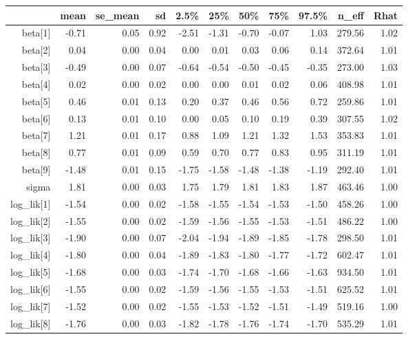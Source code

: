\begin{table}[ht]
\centering
\begin{tabular}{rrrrrrrrrrr}
  \hline
 & mean & se\_mean & sd & 2.5\% & 25\% & 50\% & 75\% & 97.5\% & n\_eff & Rhat \\ 
  \hline
beta[1] & -0.71 & 0.05 & 0.92 & -2.51 & -1.31 & -0.70 & -0.07 & 1.03 & 279.56 & 1.02 \\ 
  beta[2] & 0.04 & 0.00 & 0.04 & 0.00 & 0.01 & 0.03 & 0.06 & 0.14 & 372.64 & 1.01 \\ 
  beta[3] & -0.49 & 0.00 & 0.07 & -0.64 & -0.54 & -0.50 & -0.45 & -0.35 & 273.00 & 1.03 \\ 
  beta[4] & 0.02 & 0.00 & 0.02 & 0.00 & 0.00 & 0.01 & 0.02 & 0.06 & 408.98 & 1.01 \\ 
  beta[5] & 0.46 & 0.01 & 0.13 & 0.20 & 0.37 & 0.46 & 0.56 & 0.72 & 259.86 & 1.01 \\ 
  beta[6] & 0.13 & 0.01 & 0.10 & 0.00 & 0.05 & 0.10 & 0.19 & 0.39 & 307.55 & 1.02 \\ 
  beta[7] & 1.21 & 0.01 & 0.17 & 0.88 & 1.09 & 1.21 & 1.32 & 1.53 & 353.83 & 1.01 \\ 
  beta[8] & 0.77 & 0.01 & 0.09 & 0.59 & 0.70 & 0.77 & 0.83 & 0.95 & 311.19 & 1.01 \\ 
  beta[9] & -1.48 & 0.01 & 0.15 & -1.75 & -1.58 & -1.48 & -1.38 & -1.19 & 292.40 & 1.01 \\ 
  sigma & 1.81 & 0.00 & 0.03 & 1.75 & 1.79 & 1.81 & 1.83 & 1.87 & 463.46 & 1.00 \\ 
  log\_lik[1] & -1.54 & 0.00 & 0.02 & -1.58 & -1.55 & -1.54 & -1.53 & -1.50 & 458.26 & 1.00 \\ 
  log\_lik[2] & -1.55 & 0.00 & 0.02 & -1.59 & -1.56 & -1.55 & -1.53 & -1.51 & 486.22 & 1.00 \\ 
  log\_lik[3] & -1.90 & 0.00 & 0.07 & -2.04 & -1.94 & -1.89 & -1.85 & -1.78 & 298.50 & 1.01 \\ 
  log\_lik[4] & -1.80 & 0.00 & 0.04 & -1.89 & -1.83 & -1.80 & -1.77 & -1.72 & 602.47 & 1.01 \\ 
  log\_lik[5] & -1.68 & 0.00 & 0.03 & -1.74 & -1.70 & -1.68 & -1.66 & -1.63 & 934.50 & 1.01 \\ 
  log\_lik[6] & -1.55 & 0.00 & 0.02 & -1.59 & -1.56 & -1.55 & -1.53 & -1.51 & 625.52 & 1.01 \\ 
  log\_lik[7] & -1.52 & 0.00 & 0.02 & -1.55 & -1.53 & -1.52 & -1.51 & -1.49 & 519.16 & 1.00 \\ 
  log\_lik[8] & -1.76 & 0.00 & 0.03 & -1.82 & -1.78 & -1.76 & -1.74 & -1.70 & 535.29 & 1.01 \\ 

\end{tabular}
\end{table}
